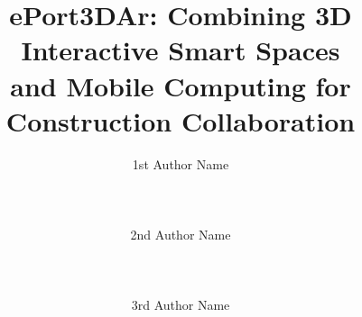 \documentclass{sigchi}
\begin{document}
\title{ePort3DAr: Combining 3D Interactive Smart Spaces\\ and Mobile Computing for Construction Collaboration}

\author{
  \alignauthor 1st Author Name\\
    \\
    \\
    \\
  \alignauthor 2nd Author Name\\
    \\
    \\
    \\
  \alignauthor 3rd Author Name\\
    \\
    \\
    \\
}

\maketitle




\end{document}
